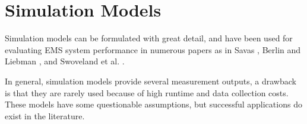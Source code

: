 \section{Simulation Models}

Simulation models
can be formulated with great detail,
and have been used for evaluating EMS system performance in numerous papers
as in Savas \cite{savas1969simulation},
Berlin and Liebman \cite{berlin1974mathematical},
and Swoveland et al. \cite{swoveland1973simulation}.

In general,
simulation models provide
several measurement outputs,
a drawback is that
they are rarely used
because of high runtime and data collection costs.
These models have some questionable assumptions,
but successful applications do exist in the literature.
